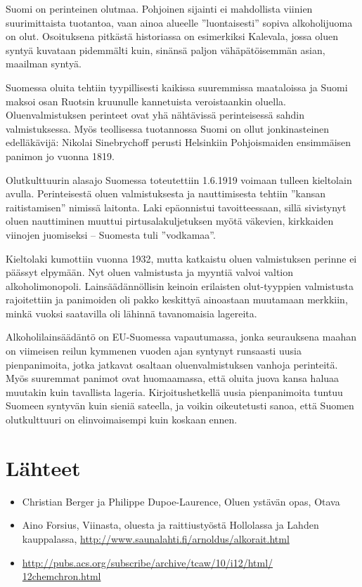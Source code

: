 \documentclass[a4paper,11pt]{report}
\begin{document}
Suomi on perinteinen olutmaa. Pohjoinen sijainti ei mahdollista viinien suurimittaista tuotantoa, vaan ainoa alueelle ''luontaisesti'' sopiva alkoholijuoma on olut. Osoituksena pitkästä historiassa on esimerkiksi Kalevala, jossa oluen syntyä kuvataan pidemmälti kuin, sinänsä paljon vähäpätöisemmän asian, maailman syntyä.

Suomessa oluita tehtiin tyypillisesti kaikissa suuremmissa maataloissa ja Suomi maksoi osan Ruotsin kruunulle kannetuista veroistaankin oluella. Oluenvalmistuksen perinteet ovat yhä nähtävissä perinteisessä sahdin valmistuksessa. Myös teollisessa tuotannossa Suomi on ollut jonkinasteinen edelläkävijä: Nikolai Sinebrychoff perusti Helsinkiin Pohjoismaiden ensimmäisen panimon jo vuonna 1819.

Olutkulttuurin alasajo Suomessa toteutettiin 1.6.1919 voimaan tulleen kieltolain avulla. Perinteisestä oluen valmistuksesta ja nauttimisesta tehtiin ''kansan raitistamisen'' nimissä laitonta. Laki epäonnistui tavoitteessaan, sillä sivistynyt oluen nauttiminen muuttui pirtusalakuljetuksen myötä väkevien, kirkkaiden viinojen juomiseksi -- Suomesta tuli ''vodkamaa''.

Kieltolaki kumottiin vuonna 1932, mutta katkaistu oluen valmistuksen perinne ei päässyt elpymään. Nyt oluen valmistusta ja myyntiä valvoi valtion alkoholimonopoli. Lainsäädännöllisin keinoin erilaisten olut-tyyppien valmistusta rajoitettiin ja panimoiden oli pakko keskittyä ainoastaan muutamaan merkkiin, minkä vuoksi saatavilla oli lähinnä tavanomaisia lagereita.

Alkoholilainsäädäntö on EU-Suomessa vapautumassa, jonka seurauksena maahan on viimeisen reilun kymmenen vuoden ajan syntynyt runsaasti uusia pienpanimoita, jotka jatkavat osaltaan oluenvalmistuksen vanhoja perinteitä. Myös suuremmat panimot ovat huomaamassa, että oluita juova kansa haluaa muutakin kuin tavallista lageria. Kirjoitushetkellä uusia pienpanimoita tuntuu Suomeen syntyvän kuin sieniä sateella, ja voikin oikeutetusti sanoa, että Suomen olutkulttuuri on elinvoimaisempi kuin koskaan ennen.


\section*{Lähteet}

\begin{itemize}
\item{Christian Berger ja Philippe Dupoe-Laurence, Oluen ystävän opas, Otava}
\item{Aino Forsius, Viinasta, oluesta ja raittiustyöstä Hollolassa ja Lahden kauppalassa, \url{http://www.saunalahti.fi/arnoldus/alkorait.html}}
\item{\url{http://pubs.acs.org/subscribe/archive/tcaw/10/i12/html/}\\
\url{12chemchron.html}}
\end{itemize}
\end{document}
